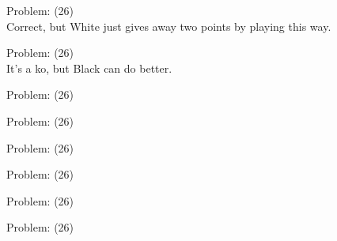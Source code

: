 \documentclass[11pt]{article}
\begin{document}
\begin{minipage}[t]{0.5\textwidth}
  {\centering
  
Problem: (26)\\
Correct, but White just gives away two points by playing this way.\\
  }
\end{minipage}
\begin{minipage}[t]{0.5\textwidth}
  {\centering
  
Problem: (26)\\
It's a ko, but Black can do better.\\
  }
\end{minipage}
\begin{minipage}[t]{0.5\textwidth}
  {\centering
  
Problem: (26)\\
  }
\end{minipage}
\begin{minipage}[t]{0.5\textwidth}
  {\centering
  
Problem: (26)\\
  }
\end{minipage}
\begin{minipage}[t]{0.5\textwidth}
  {\centering
  
Problem: (26)\\
  }
\end{minipage}
\begin{minipage}[t]{0.5\textwidth}
  {\centering
  
Problem: (26)\\
  }
\end{minipage}
\begin{minipage}[t]{0.5\textwidth}
  {\centering
  
Problem: (26)\\
  }
\end{minipage}
\begin{minipage}[t]{0.5\textwidth}
  {\centering
  
Problem: (26)\\
  }
\end{minipage}
\end{document}
